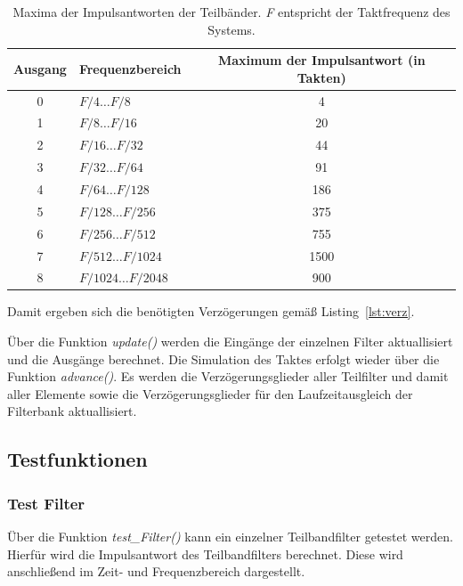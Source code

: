 \begin{table}[!htpb]
  \centering
  \begin{tabular}{c | l | c}
    \toprule
    Ausgang&Frequenzbereich&Maximum der Impulsantwort (in Takten)\\
    \midrule
    0&$F/4\ldots F/8$&4\\
    1&$F/8\ldots F/16$&20\\
    2&$F/16\ldots F/32$&44\\
    3&$F/32\ldots F/64$&91\\
    4&$F/64\ldots F/128$&186\\
    5&$F/128\ldots F/256$&375\\
    6&$F/256\ldots F/512$&755\\
    7&$F/512\ldots F/1024$&1500\\
    8&$F/1024\ldots F/2048$&900\\
    \bottomrule
  \end{tabular}
  \caption{Maxima der Impulsantworten der Teilbänder. \emph{F} entspricht der Taktfrequenz des Systems.}
  \label{tab:filt_max}
\end{table}
Damit ergeben sich die benötigten Verzögerungen gemäß Listing~\ref{lst:verz}.



Über die Funktion \emph{update()} werden die Eingänge der einzelnen Filter aktuallisiert und die Ausgänge berechnet. Die Simulation des Taktes erfolgt wieder über die Funktion \emph{advance()}. Es werden die Verzögerungsglieder aller Teilfilter und damit aller Elemente sowie die Verzögerungsglieder für den Laufzeitausgleich der Filterbank aktuallisiert.


\subsection{Testfunktionen}\label{sec:impl_test}

\subsubsection{Test Filter}\label{sec:impl_testFilter}
Über die Funktion \emph{test\_Filter()} kann ein einzelner Teilbandfilter getestet werden. Hierfür wird die Impulsantwort des Teilbandfilters berechnet. Diese wird anschließend im Zeit- und Frequenzbereich dargestellt.

